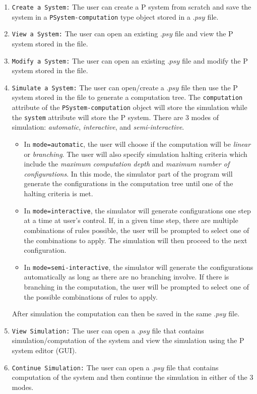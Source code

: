 \documentclass{article}
\begin{document}
\begin{enumerate}
\item \texttt{Create a System:} The user can create a P system from scratch and save the system in
a \texttt{PSystem-computation} type object stored in a $.psy$ file.

\item \texttt{View a System:} The user can open an existing $.psy$ file and view the P system stored
in the file.

\item \texttt{Modify a System:} The user can open an existing $.psy$ file and modify the P system 
stored in the file. 

\item \texttt{Simulate a System:} The user can open/create a $.psy$ file then use the P system
stored in the file to generate a computation tree. The \texttt{computation} attribute of the
\texttt{PSystem-computation} object will store the simulation while the \texttt{system} attribute
will store the P system. There are 3 modes of simulation: \textit{automatic}, \textit{interactive},
and \textit{semi-interactive}. 

\begin{itemize}

\item In \texttt{mode=automatic}, the user will choose if the computation will be \textit{linear} or
\textit{branching}. The user will also specify simulation halting criteria which include the 
\textit{maximum computation depth} and \textit{maximum number of configurations}. In this mode, the
simulator part of the program will generate the configurations in the computation tree until one of
the halting criteria is met.

\item In \texttt{mode=interactive}, the simulator will generate configurations one step at a time at
user's control. If, in a given time step, there are multiple combinations of rules possible, the
user will be prompted to select one of the combinations to apply. The simulation will then proceed 
to the next configuration.

\item In \texttt{mode=semi-interactive}, the simulator will generate the configurations 
automatically as long as there are no branching involve. If there is branching in the computation, 
the user will be prompted to select one of the possible combinations of rules to apply.

\end{itemize}

After simulation the computation can then be saved in the same $.psy$ file.

\item \texttt{View Simulation:} The user can open a $.psy$ file that contains simulation/computation
of the system and view the simulation using the P system editor (GUI).

\item \texttt{Continue Simulation:} The user can open a $.psy$ file that contains computation of the
system and then continue the simulation in either of the 3 modes.

\end{enumerate}
\end{document}
